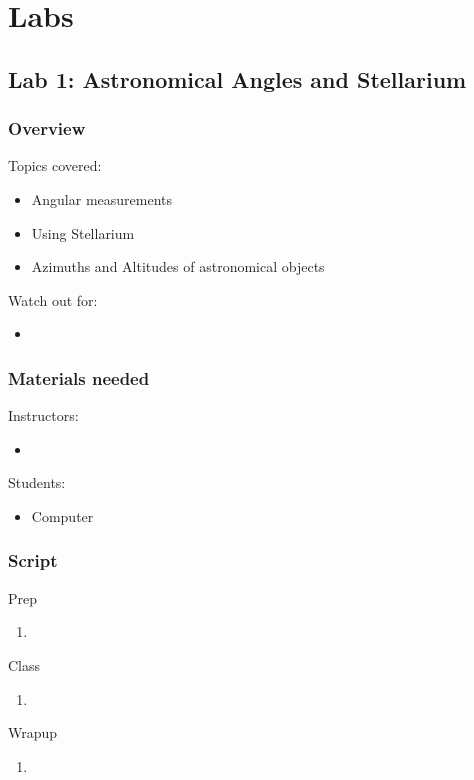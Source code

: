 \documentclass[12pt]{article}
\begin{document}
\newpage
\section{Labs}
\subsection{Lab 1: Astronomical Angles and Stellarium}
\subsubsection{Overview}
Topics covered:
\begin{itemize}
\item Angular measurements
\item Using Stellarium
\item Azimuths and Altitudes of astronomical objects
\end{itemize}
Watch out for:
\begin{itemize}
\item 
\end{itemize}

\subsubsection{Materials needed}
Instructors:
\begin{itemize}
  \item 
\end{itemize}
Students:
\begin{itemize}
  \item Computer
\end{itemize}

\subsubsection{Script}
Prep
\begin{enumerate}
\item
\end{enumerate}
Class
\begin{enumerate}
\item
\end{enumerate}
Wrapup
\begin{enumerate}
\item
\end{enumerate}
\end{document}
